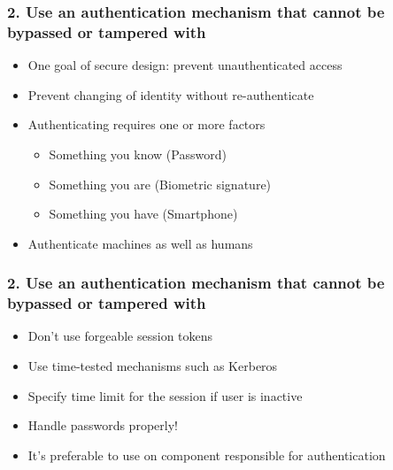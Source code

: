 \documentclass[12pt,norsk]{beamer}
\begin{document}
\begin{frame}

	\frametitle{2. Use an authentication mechanism that cannot be bypassed or tampered with}
	
	\begin{itemize}
		\item One goal of secure design: prevent unauthenticated access
		\item Prevent changing of identity without re-authenticate 
		\item Authenticating requires one or more factors	
	
		\begin{itemize}
			\item Something you know (Password)
			\item Something you are (Biometric signature)
			\item Something you have (Smartphone)
		\end{itemize}
		
		\item Authenticate machines as well as humans	
	
	\end{itemize}
	
	
\end{frame}

\begin{frame}

	\frametitle{2. Use an authentication mechanism that cannot be bypassed or tampered with}
	
	\begin{itemize}
		\item Don't use forgeable session tokens
		\item Use time-tested mechanisms such as Kerberos\cite{kerberos} 
		\item Specify time limit for the session if user is inactive
		\item Handle passwords properly!
		\item It's preferable to use on component responsible for authentication
	\end{itemize}
	
\end{frame}
\end{document}
